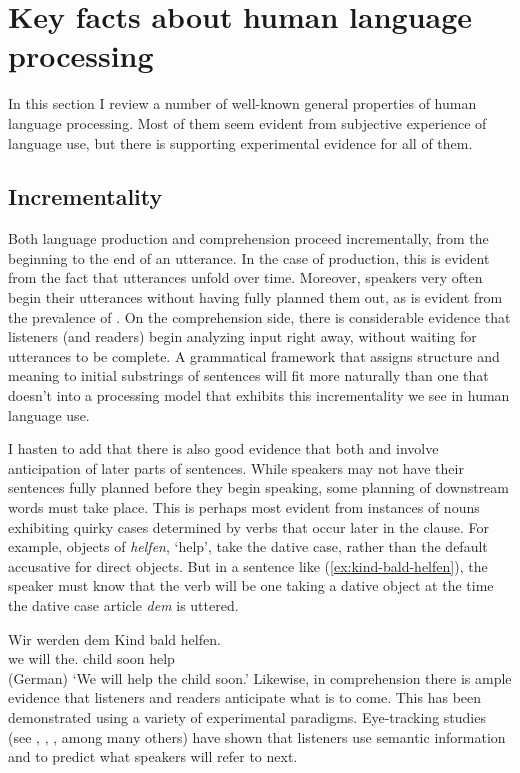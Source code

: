 \documentclass[output=paper,biblatex,babelshorthands,newtxmath,draftmode,colorlinks,citecolor=brown]{langscibook}
\begin{document}
\section{Key facts about human language processing}
\label{sec-key-facts}

In this section I review a number of well-known general properties of human language processing.  Most of them seem evident from subjective experience of language use, but there is supporting experimental evidence for all of them.  

\subsection{Incrementality}
\label{processing:incrementality}

\largerpage\enlargethispage{3pt}
Both language production and comprehension proceed incrementally, from the beginning to the end of
an utterance.  In the case of production, this is evident from the fact that utterances unfold over
time.  Moreover, speakers very often begin their utterances without having fully planned them out,
as is evident from the prevalence of .  On the comprehension side, there is
considerable evidence that listeners (and readers) begin analyzing input right away, without waiting
for utterances to be complete.  A grammatical framework that assigns structure and meaning to
initial substrings of sentences will fit more naturally than one that doesn't into a processing
model that exhibits this incrementality we see in human language use.

I hasten to add that there is also good evidence that both  and 
involve anticipation of later parts of sentences.  While speakers may not have their sentences fully
planned before they begin speaking, some planning of downstream words must take place.  This is
perhaps most evident from instances of nouns exhibiting quirky cases determined by verbs that occur
later in the clause.  For example, objects of  \emph{helfen}, `help', take the dative
case, rather than the default accusative for direct objects.  But in a sentence like
(\ref{ex:kind-bald-helfen}), the speaker must know that the verb will be one taking a dative object
at the time the dative case article \emph{dem} is uttered.

\ea\label{ex:kind-bald-helfen}
\gll Wir werden dem        Kind bald helfen.\\
     we will    the.\DAT{} child soon help\\\hfill (German)
\glt `We will help the child soon.'
\z
Likewise, in comprehension there is ample evidence that listeners and readers anticipate what is to
come.  This has been demonstrated using a variety of experimental paradigms.  Eye-tracking
studies (see \citealt{TanenhausEtal1995}, \citealt{AltmannKamide99}, \citealt{ArnoldEtal2007}, among
many others) have shown that listeners use semantic information and  to predict
what speakers will refer to next. 
\end{document}

